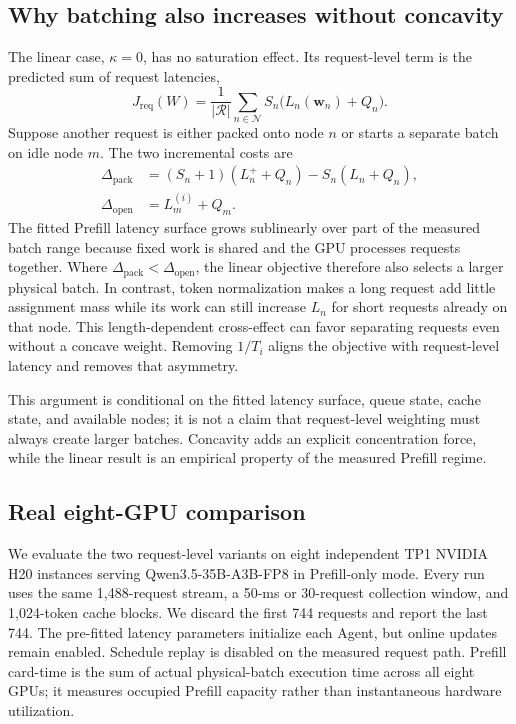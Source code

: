 \documentclass[10pt]{article}
\begin{document}
\subsection{Why batching also increases without concavity}

The linear case, $\kappa=0$, has no saturation effect. Its request-level term
is the predicted sum of request latencies,
\begin{equation}
J_{\mathrm{req}}(W)=\frac{1}{|\mathcal R|}
\sum_{n\in\mathcal N}S_n\bigl(L_n(\mathbf w_n)+Q_n\bigr).
\label{eq:linear-request-latency-objective}
\end{equation}
Suppose another request is either packed onto node $n$ or starts a separate
batch on idle node $m$. The two incremental costs are
\begin{equation}
\begin{aligned}
\Delta_{\mathrm{pack}}
  &=(S_n+1)(L_n^{+}+Q_n)-S_n(L_n+Q_n),\\
\Delta_{\mathrm{open}}
  &=L_m^{(i)}+Q_m.
\end{aligned}
\label{eq:linear-pack-condition}
\end{equation}
The fitted Prefill latency surface grows sublinearly over part of the measured
batch range because fixed work is shared and the GPU processes requests
together. Where $\Delta_{\mathrm{pack}}<\Delta_{\mathrm{open}}$, the linear
objective therefore also selects a larger physical batch. In contrast, token
normalization makes a long request add little assignment mass while its work
can still increase $L_n$ for short requests already on that node. This
length-dependent cross-effect can favor separating requests even without a
concave weight. Removing $1/T_i$ aligns the objective with request-level
latency and removes that asymmetry.

This argument is conditional on the fitted latency surface, queue state, cache
state, and available nodes; it is not a claim that request-level weighting
must always create larger batches. Concavity adds an explicit concentration
force, while the linear result is an empirical property of the measured
Prefill regime.

\subsection{Real eight-GPU comparison}

We evaluate the two request-level variants on eight independent TP1 NVIDIA
H20 instances serving Qwen3.5-35B-A3B-FP8 in Prefill-only mode. Every run
uses the same 1,488-request stream, a 50-ms or 30-request collection window,
and 1,024-token cache blocks. We discard the first 744 requests and report the
last 744. The pre-fitted latency parameters initialize each Agent, but online
updates remain enabled. Schedule replay is disabled on the measured request
path. Prefill card-time is the sum of actual physical-batch execution time
across all eight GPUs; it measures occupied Prefill capacity rather than
instantaneous hardware utilization.
\end{document}
